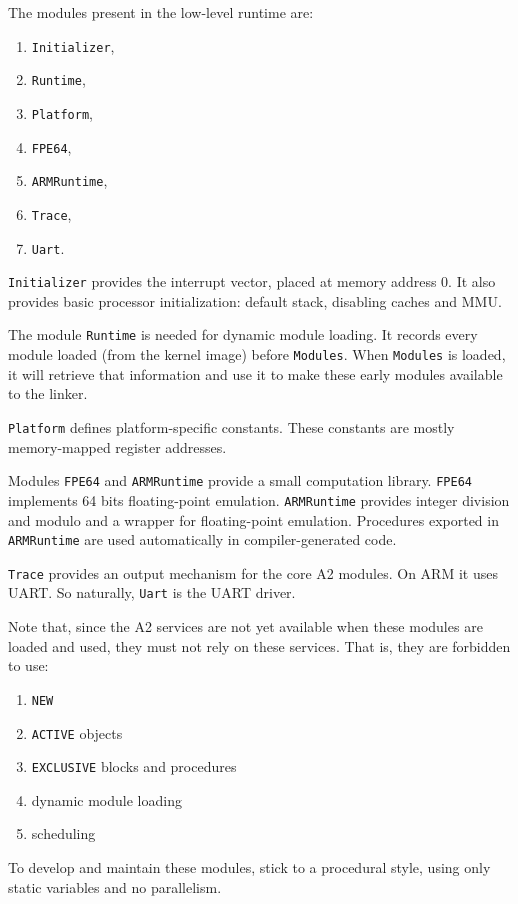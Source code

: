 \documentclass[a4paper]{article}
\newcommand{\module}[1]{\texttt{#1}}
\begin{document}
The modules present in the low-level runtime are:
\begin{enumerate}
    \item \module{Initializer},
    \item \module{Runtime},
    \item \module{Platform},
    \item \module{FPE64},
    \item \module{ARMRuntime},
    \item \module{Trace},
    \item \module{Uart}.
\end{enumerate}

\module{Initializer} provides the interrupt vector, placed at memory address
$0$. It also provides basic processor initialization: default stack, disabling
caches and MMU.

The module \module{Runtime} is needed for dynamic module loading. It records
every module loaded (from the kernel image) before \module{Modules}. When
\module{Modules} is loaded, it will retrieve that information and use it to make
these early modules available to the linker.

\module{Platform} defines platform-specific constants. These constants are
mostly memory-mapped register addresses.

Modules \module{FPE64} and \module{ARMRuntime} provide a small computation
library. \module{FPE64} implements 64 bits floating-point emulation.
\module{ARMRuntime} provides integer division and modulo and a wrapper for
floating-point emulation. Procedures exported in \module{ARMRuntime} are used
automatically in compiler-generated code.

\module{Trace} provides an output mechanism for the core A2 modules. On ARM it
uses UART. So naturally, \module{Uart} is the UART driver.

Note that, since the A2 services are not yet available when these modules are
loaded and used, they must not rely on these services. That is, they are
forbidden to use:
\begin{enumerate}
    \item \texttt{NEW}
    \item \texttt{ACTIVE} objects
    \item \texttt{EXCLUSIVE} blocks and procedures
    \item dynamic module loading
    \item scheduling
\end{enumerate}
To develop and maintain these modules, stick to a procedural style, using only
static variables and no parallelism.
\end{document}
